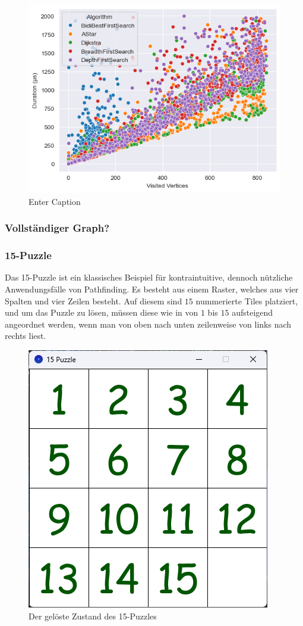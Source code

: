                 \begin{figure}
                    \centering
                    \includegraphics[width=0.5\linewidth]{images/plots/modifiable/1000/1000/1000/iterative/any/vertices_duration.png}
                    \caption{Enter Caption}
                    \label{fig:enter-label2}
                \end{figure}


            \subsubsection{Vollständiger Graph?}
                

            \subsubsection{15-Puzzle} \label{15-puzzle}

                Das 15-Puzzle ist ein klassisches Beispiel für kontraintuitive, dennoch nützliche Anwendungsfälle von Pathfinding. Es besteht aus einem Raster, welches aus vier Spalten und vier Zeilen besteht. Auf diesem sind $15$ nummerierte Tiles platziert, und um das Puzzle zu lösen, müssen diese wie in  von $1$ bis $15$ aufsteigend angeordnet werden, wenn man von oben nach unten zeilenweise von links nach rechts liest.

                \begin{figure}
                    \centering
                    \includegraphics[width=0.5\linewidth]{images/15-puzzle-solved.png}
                    \caption{Der gelöste Zustand des 15-Puzzles}
                    \label{fig:15-solved}
                \end{figure}

